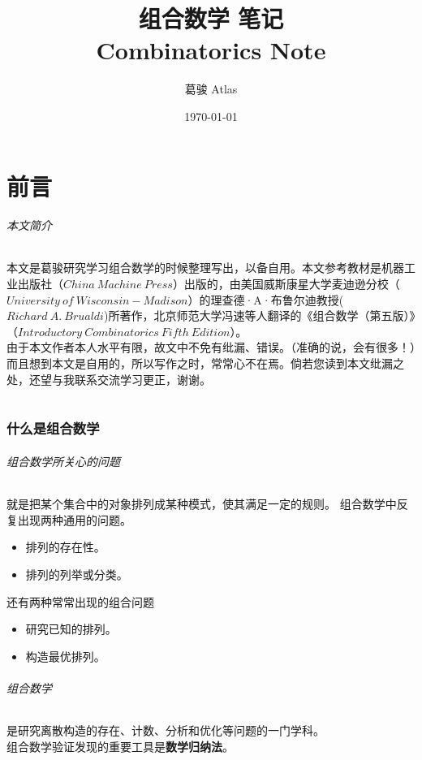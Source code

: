 \documentclass{ctexart}
\title{组合数学 笔记\\Combinatorics Note}
\author{葛骏 Atlas}
\date{\today}
\begin{document}
    \begin{titlepage}
        \maketitle
    \end{titlepage}
    \tableofcontents

    \part*{前言}
    \paragraph{本文简介} 本文是葛骏研究学习组合数学的时候整理写出，以备自用。本文参考教材是机器工业出版社（$China \ Machine \  Press$）出版的，由美国威斯康星大学麦迪逊分校（$University \ of \ Wisconsin-Madison$）的理查德·A·布鲁尔迪教授($Richard \ A. \ Brualdi$)所著作，北京师范大学冯速等人翻译的《组合数学（第五版）》（$Introductory \ Combinatorics \ Fifth \ Edition$）。\\
    由于本文作者本人水平有限，故文中不免有纰漏、错误。（准确的说，会有很多！）而且想到本文是自用的，所以写作之时，常常心不在焉。倘若您读到本文纰漏之处，还望与我联系交流学习更正，谢谢。
    \part*{}
    \section{什么是组合数学}
    \paragraph{组合数学所关心的问题} 就是把某个集合中的对象排列成某种模式，使其满足一定的规则。
    组合数学中反复出现两种通用的问题。
    \begin{itemize}
        \item 排列的存在性。
        \item 排列的列举或分类。
    \end{itemize}

    还有两种常常出现的组合问题
    
    \begin{itemize}
        \item 研究已知的排列。
        \item 构造最优排列。
    \end{itemize}
    \paragraph{组合数学}是研究离散构造的存在、计数、分析和优化等问题的一门学科。\\
    组合数学验证发现的重要工具是\textbf{数学归纳法}。
\end{document}

